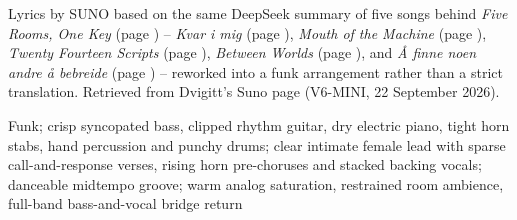 
\begin{notes}
Lyrics by SUNO based on the same DeepSeek summary of five songs behind \emph{Five Rooms, One Key} (page \pageref{sec:five-rooms-one-key}) -- \emph{Kvar i mig} (page \pageref{sec:kvar-i-mig}), \emph{Mouth of the Machine} (page \pageref{sec:mouth-of-the-machine}), \emph{Twenty Fourteen Scripts} (page \pageref{sec:twenty-fourteen-scripts}), \emph{Between Worlds} (page \pageref{sec:between-worlds}), and \emph{Å finne noen andre å bebreide} (page \pageref{sec:aa-finne-noen-andre-aa-bebreide}) -- reworked into a funk arrangement rather than a strict translation. Retrieved from Dvigitt's Suno page (V6-MINI, 22 September 2026).
\end{notes}
\begin{style}
Funk; crisp syncopated bass, clipped rhythm guitar, dry electric piano, tight horn stabs, hand percussion and punchy drums; clear intimate female lead with sparse call-and-response verses, rising horn pre-choruses and stacked backing vocals; danceable midtempo groove; warm analog saturation, restrained room ambience, full-band bass-and-vocal bridge return
\end{style}
